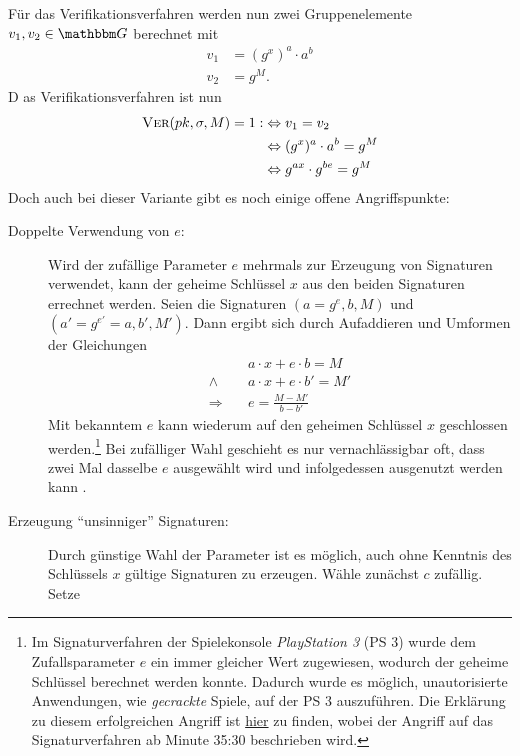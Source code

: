 Für das Verifikationsverfahren werden nun zwei Gruppenelemente $v_1, v_2
\in \G$ berechnet mit
\begin{align*} 
  v_1 &= (g^x)^a \cdot a^b\\ v_2 &= g^M.
\end{align*} D
as Verifikationsverfahren ist nun
\begin{align*} 
  \textsc{Ver}(pk,\sigma,M) = 1 : & \Leftrightarrow v_1 = v_2 \\
                             &\Leftrightarrow (g^x)^a \cdot a^b = g^M \\ 
                             &\Leftrightarrow g^{ax}\cdot g^{be} = g^M
\end{align*} 
Doch auch bei dieser Variante gibt es noch einige offene
Angriffspunkte:
\begin{description}
\item[Doppelte Verwendung von $e$:] Wird der zufällige Parameter
  $e$ mehrmals zur Erzeugung von Signaturen verwendet, kann der geheime
  Schlüssel $x$ aus den beiden Signaturen errechnet werden. Seien die
  Signaturen $(a = g^e, b, M)$ und $(a' = g^{e'} = a, b', M')$. Dann
  ergibt sich durch Aufaddieren und Umformen der Gleichungen
  \begin{align*} &a \cdot x + e \cdot b = M\\ \land \quad &a \cdot
                                                            x + e \cdot b' = M'\\ \Rightarrow \quad &e = \frac{M - M'}{b - b'}
  \end{align*} Mit bekanntem $e$ kann wiederum auf den geheimen
  Schlüssel $x$ geschlossen werden.\footnote{Im Signaturverfahren der
    Spielekonsole \textit{PlayStation 3} (PS 3) wurde dem Zufallsparameter
    $e$ ein immer gleicher Wert zugewiesen, wodurch der geheime Schlüssel
    berechnet werden konnte. Dadurch wurde es möglich, unautorisierte
    Anwendungen, wie \textit{gecrackte} Spiele, auf der PS 3
    auszuführen. Die Erklärung zu diesem erfolgreichen Angriff ist
    \href{https://www.youtube.com/watch?v=4loZGYqaZ7I}{hier} zu finden,
    wobei der Angriff auf das Signaturverfahren ab Minute 35:30 beschrieben
    wird.} Bei zufälliger Wahl geschieht es nur vernachlässigbar oft, dass
  zwei Mal dasselbe $e$ ausgewählt wird und infolgedessen ausgenutzt
  werden kann .
\item[Erzeugung "`unsinniger"' Signaturen:] Durch günstige Wahl
  der Parameter ist es möglich, auch ohne Kenntnis des Schlüssels $x$
  gültige Signaturen zu erzeugen. Wähle zunächst $c$ zufällig. Setze

\end{description}
